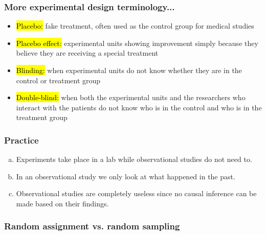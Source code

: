 \documentclass[slidestop,compress,mathserif]{beamer}
\begin{document}
\begin{frame}
\frametitle{More experimental design terminology...}

\begin{itemize}

\item \hl{Placebo:} fake treatment, often used as the control group for medical studies

\item \hl{Placebo effect:} experimental units showing improvement simply because they believe they are receiving a special treatment

\item \hl{Blinding:} when experimental units do not know whether they are in the control or treatment group

\item \hl{Double-blind:} when both the experimental units and the researchers who interact with the patients do not know who is in the control and who is in the treatment group

\end{itemize}

\end{frame}


\begin{frame}
\frametitle{Practice}


\begin{enumerate}[(a)]
\item Experiments take place in a lab while observational studies do not need to.
\item In an observational study we only look at what happened in the past.
\item Observational studies are completely useless since no causal inference can be made based on their findings.
\end{enumerate}

\end{frame}


\begin{frame}
\frametitle{Random assignment vs. random sampling}

\begin{center}
\end{center}

\end{frame}



\end{document}
